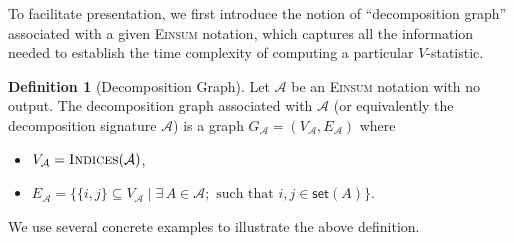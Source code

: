 \documentclass[sn-mathphys, natbib=false]{sn-jnl}
\theoremstyle{plain}
\theoremstyle{definition}
\newtheorem{definition}{Definition}
\newtheorem{remark}{Remark}
\def\Einsum{\textsc{Einsum}}
\newcommand{\takesetp}[1]{\mathsf{set}(#1)}
\newcommand{\indexset}{\textsc{Indices}}
\newcommand{\graphform}[1]{G_{#1}}
\newcommand{\Lin}[1]{{\color{purple}{#1}}}
\def\calA{\mathcal{A}}
\begin{document}
\begin{bibunit}[agsm]
To facilitate presentation, we first introduce the notion of ``decomposition graph'' associated with a given \Einsum{} notation, which captures all the information needed to establish the time complexity of computing a particular $V$-statistic.

\begin{definition}[Decomposition Graph]\label{def:graph_decomp}
Let $\calA$ be an \Einsum{} notation with no output. The decomposition graph associated with $\calA$ (or equivalently the decomposition signature $\calA$) is a graph $\graphform{\calA} = (V_{\calA}, E_{\calA})$ where
    \begin{itemize}
        \item $V_{\calA} = \indexset(\calA)$, 
        \item $E_{\calA} = \big\{ \{i, j\} \subseteq V_{\calA} \mid \exists \, A \in \calA; \text{ such that } i, j \in \takesetp{A} \big\}$.
    \end{itemize}
\end{definition}



We use several concrete examples to illustrate the above definition.


\end{bibunit}
\end{document}

